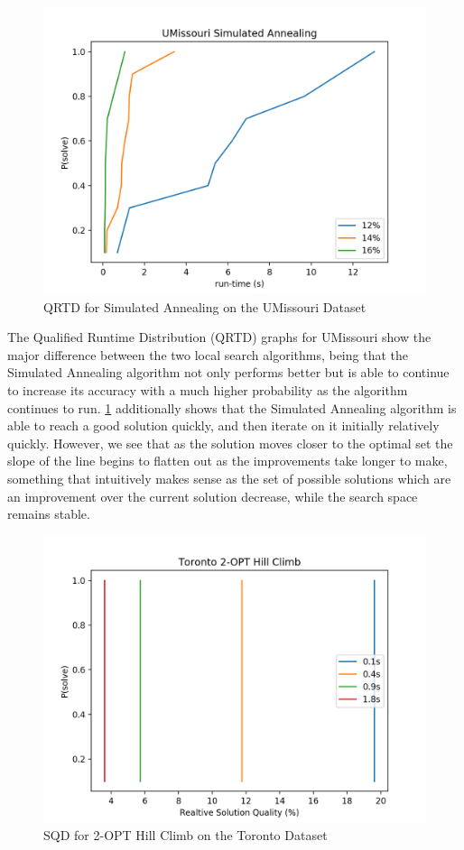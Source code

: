 \documentclass[format=sigconf]{acmart}
\begin{document}
\begin{figure}[htbp]
    \centerline{\includegraphics[scale=.5]{graphs/UMissouri_LS2_QRTD.png}}
    \caption{QRTD for Simulated Annealing on the UMissouri Dataset}
    \label{fig4}
\end{figure}

The Qualified Runtime Distribution (QRTD) graphs for UMissouri show the major difference between the two local search algorithms, being that the 
Simulated Annealing algorithm not only performs better but is able to continue to increase its accuracy with a much higher 
probability as the algorithm continues to run. \ref{fig4} additionally shows that the Simulated Annealing algorithm is able 
to reach a good solution quickly, and then iterate on it initially relatively quickly. However, we see that as the solution moves 
closer to the optimal set the slope of the line begins to flatten out as the improvements take longer to make, something that intuitively makes sense 
as the set of possible solutions which are an improvement over the current solution decrease, while the search space remains stable.
\begin{figure}[htbp]
    \centerline{\includegraphics[scale=.5]{graphs/Toronto_LS1_SQD.png}}
    \caption{SQD for 2-OPT Hill Climb on the Toronto Dataset}
    \label{fig5}
\end{figure}
\end{document}
